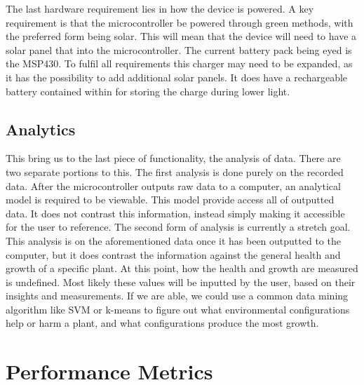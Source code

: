 \documentclass[IEEEtran,letterpaper,10pt,titlepage,fleqn,draftclsnofoot,onecolumn]{article}
\begin{document}
\vspace{5mm}

The last hardware requirement lies in how the device is powered. A key requirement is that the microcontroller be powered through green methods, with the preferred form being solar. This will mean that the device will need to have a solar panel that into the microcontroller. The current battery pack being eyed is the MSP430. To fulfil all requirements this charger may need to be expanded, as it has the possibility to add additional solar panels. It does have a rechargeable battery contained within for storing the charge during lower light.

\clearpage

\subsection{Analytics}

This bring us to the last piece of functionality, the analysis of data. There are two separate portions to this. The first analysis is done purely on the recorded data. After the microcontroller outputs raw data to a computer, an analytical model is required to be viewable. This model provide access all of outputted data. It does not contrast this information, instead simply making it accessible for the user to reference. The second form of analysis is currently a stretch goal. This analysis is on the aforementioned data once it has been outputted to the computer, but it does contrast the information against the general health and growth of a specific plant. At this point, how the health and growth are measured is undefined. Most likely these values will be inputted by the user, based on their insights and measurements. If we are able, we could use a common data mining algorithm like SVM or k-means to figure out what environmental configurations help or harm a plant, and what configurations produce the most growth. 

\vspace{5mm}

\section{Performance Metrics}
\end{document}
